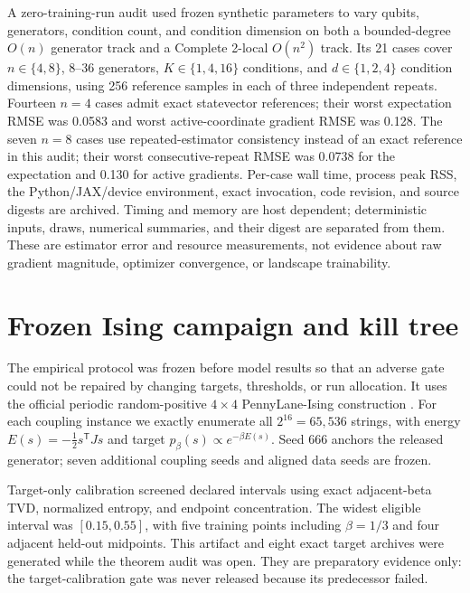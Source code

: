 \documentclass[a4paper,twocolumn,11pt,unpublished]{quantumarticle}
\begin{document}
A zero-training-run audit used frozen synthetic parameters to vary qubits,
generators, condition count, and condition dimension on both a bounded-degree
$O(n)$ generator track and a Complete 2-local $O(n^2)$ track.  Its 21 cases
cover $n\in\{4,8\}$, 8--36 generators, $K\in\{1,4,16\}$ conditions, and
$d\in\{1,2,4\}$ condition dimensions, using 256 reference samples in each of
three independent repeats.  Fourteen $n=4$ cases admit exact statevector
references; their worst expectation RMSE was 0.0583 and worst active-coordinate
gradient RMSE was 0.128.  The seven $n=8$ cases use repeated-estimator
consistency instead of an exact reference in this audit; their worst
consecutive-repeat RMSE was 0.0738 for the expectation and 0.130 for active
gradients.  Per-case wall time, process peak RSS, the Python/JAX/device
environment, exact invocation, code revision, and source digests are archived.
Timing and memory are host dependent; deterministic inputs, draws, numerical
summaries, and their digest are separated from them.  These are
estimator error and resource measurements, not evidence about raw gradient
magnitude, optimizer convergence, or landscape trainability.

\section{Frozen Ising campaign and kill tree}
\label{sec:campaign}

The empirical protocol was frozen before model results so that an adverse gate
could not be repaired by changing targets, thresholds, or run allocation.  It
uses the official periodic random-positive $4\times4$ PennyLane-Ising
construction \cite{pennylaneIsingDataset2026,pennylaneIsingGenerator2026}.
For each coupling instance we exactly enumerate all $2^{16}=65{,}536$ strings,
with energy $E(s)=-\tfrac12s^\mathsf{T}Js$ and target
$p_\beta(s)\propto e^{-\beta E(s)}$.  Seed 666 anchors the released generator;
seven additional coupling seeds and aligned data seeds are frozen.

Target-only calibration screened declared intervals using exact adjacent-beta
TVD, normalized entropy, and endpoint concentration.  The widest eligible
interval was $[0.15,0.55]$, with five training points including $\beta=1/3$
and four adjacent held-out midpoints.  This artifact and eight exact target
archives were generated while the theorem audit was open.  They are
preparatory evidence only: the target-calibration gate was never released
because its predecessor failed.
\end{document}

